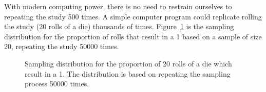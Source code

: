 \documentclass[
  letterpaper,
  DIV=11,
  numbers=noendperiod]{scrreprt}
\theoremstyle{definition}
\theoremstyle{definition}
\theoremstyle{plain}
\theoremstyle{remark}
\begin{document}
With modern computing power, there is no need to restrain ourselves to
repeating the study 500 times. A simple computer program could replicate
rolling the study (20 rolls of a die) thousands of times.
Figure~\ref{fig-samplingdistns-dice-histogram} is the sampling
distribution for the proportion of rolls that result in a 1 based on a
sample of size 20, repeating the study 50000 times.

\begin{figure}


\caption{\label{fig-samplingdistns-dice-histogram}Sampling distribution
for the proportion of 20 rolls of a die which result in a 1. The
distribution is based on repeating the sampling process 50000 times.}

\end{figure}%
\end{document}
